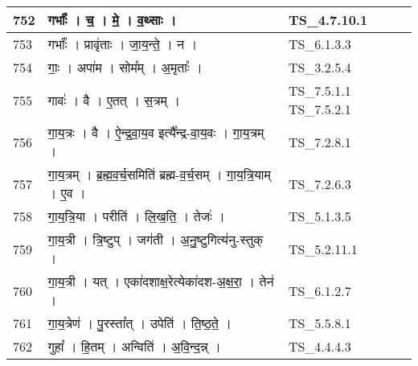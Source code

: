 \documentclass[17pt]{extarticle}
\begin{document}
\begin{longtable}{||p{0.4in}||p{4.9in}||p{0.9in}||}
    \hline
        
    752 & गर्भाः᳚   ।   च॒   ।   मे॒   ।   व॒थ्साः   ।    & TS\_4.7.10.1       \\
    
    \hline
        
    753 & गर्भाः᳚   ।   प्रावृ॑ताः   ।   जा॒य॒न्ते॒   ।   न   ।    & TS\_6.1.3.3       \\
    
    \hline
        
    754 & गाः॒   ।   अपा॑म   ।   सोम᳚म्   ।   अ॒मृताः᳚   ।    & TS\_3.2.5.4       \\
    
    \hline
        
    755 & गावः॑   ।   वै   ।   ए॒तत्   ।   स॒त्रम्   ।    & TS\_7.5.1.1 TS\_7.5.2.1       \\
    
    \hline
        
    756 & गा॒य॒त्रः   ।   वै   ।   ऐ॒न्द्र॒वा॒य॒व इत्यै᳚न्द्र{-}वा॒य॒वः   ।   गा॒य॒त्रम्   ।    & TS\_7.2.8.1       \\
    
    \hline
        
    757 & गा॒य॒त्रम्   ।   ब्र॒ह्म॒व॒र्च॒समिति॑ ब्रह्म{-}व॒र्च॒सम्   ।   गा॒य॒त्रि॒याम्   ।   ए॒व   ।    & TS\_7.2.6.3       \\
    
    \hline
        
    758 & गा॒य॒त्रि॒या   ।   परीति॑   ।   लि॒ख॒ति॒   ।   तेजः॑   ।    & TS\_5.1.3.5       \\
    
    \hline
        
    759 & गा॒य॒त्री   ।   त्रि॒ष्टुप्   ।   जग॑ती   ।   अ॒नु॒ष्टुगित्य॑नु{-}स्तुक्   ।    & TS\_5.2.11.1       \\
    
    \hline
        
    760 & गा॒य॒त्री   ।   यत्   ।   एका॑दशाक्ष॒रेत्येका॑दश{-}अ॒क्ष॒रा॒   ।   तेन॑   ।    & TS\_6.1.2.7       \\
    
    \hline
        
    761 & गा॒य॒त्रेण॑   ।   पु॒रस्ता᳚त्   ।   उपेति॑   ।   ति॒ष्ठ॒ते॒   ।    & TS\_5.5.8.1       \\
    
    \hline
        
    762 & गुहा᳚   ।   हि॒तम्   ।   अन्विति॑   ।   अ॒वि॒न्द॒न्न्   ।    & TS\_4.4.4.3       \\
    

\end{longtable}
\end{document}
